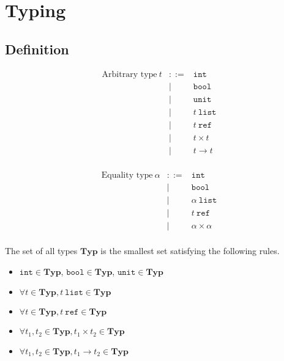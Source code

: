 \documentclass{article}
\begin{document}
\section{Typing}

\subsection{Definition}

\begin{figure}[h]
\begin{minipage}{0.5\textwidth}
\[\begin{array}{rcl}
  \mbox{Arbitrary type}\ t
    & ::= & \texttt{int} \\
    &  |  & \texttt{bool} \\
    &  |  & \texttt{unit} \\
    &  |  & t\ \texttt{list} \\
    &  |  & t\ \texttt{ref} \\
    &  |  & t \times t \\
    &  |  & t \to t \\
\end{array}\]
\end{minipage}
\begin{minipage}{0.5\textwidth}
\[\begin{array}{rcl}
  \mbox{Equality type}\ \alpha
    & ::= & \texttt{int} \\
    &  |  & \texttt{bool} \\
    &  |  & \alpha\ \texttt{list} \\
    &  |  & t\ \texttt{ref} \\
    &  |  & \alpha \times \alpha \\
\end{array}\]
\end{minipage}
\end{figure}

The set of all types $\mathbf{Typ}$ is the smallest set satisfying the following rules.
\begin{itemize}
  \item $\texttt{int}\in\mathbf{Typ}$, $\texttt{bool}\in\mathbf{Typ}$, $\texttt{unit}\in\mathbf{Typ}$
  \item $\forall t\in\mathbf{Typ}, t\ \texttt{list}\in\mathbf{Typ}$
  \item $\forall t\in\mathbf{Typ}, t\ \texttt{ref}\in\mathbf{Typ}$
  \item $\forall t_1,t_2\in\mathbf{Typ}, t_1\times t_2\in\mathbf{Typ}$
  \item $\forall t_1,t_2\in\mathbf{Typ}, t_1\to t_2\in\mathbf{Typ}$
\end{itemize}
\end{document}
